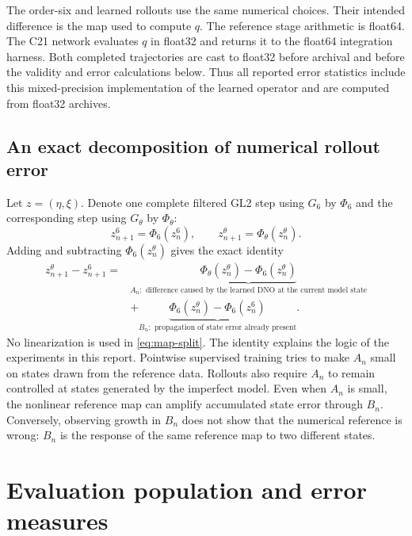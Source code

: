 \documentclass[11pt]{article}
\begin{document}
The order-six and learned rollouts use the same numerical choices.  Their
intended difference is the map used to compute $q$.  The reference stage
arithmetic is float64.  The C21 network evaluates $q$ in float32 and returns it
to the float64 integration harness.  Both completed trajectories are cast to
float32 before archival and before the validity and error calculations below.
Thus all reported error statistics include this mixed-precision implementation
of the learned operator and are computed from float32 archives.

\subsection{An exact decomposition of numerical rollout error}

Let $z=(\eta,\xi)$.  Denote one complete filtered GL2 step using $G_6$ by
$\Phi_6$ and the corresponding step using $G_\theta$ by $\Phi_\theta$:
\begin{equation}
  z_{n+1}^{6}=\Phi_6(z_n^6),
  \qquad
  z_{n+1}^{\theta}=\Phi_\theta(z_n^\theta).
\end{equation}
Adding and subtracting $\Phi_6(z_n^\theta)$ gives the exact identity
\begin{equation}
\begin{split}
 z_{n+1}^{\theta}-z_{n+1}^{6}
 ={}&\underbrace{\Phi_\theta(z_n^\theta)-\Phi_6(z_n^\theta)}_{A_n:
 \text{ difference caused by the learned DNO at the current model state}}\\
 &+\underbrace{\Phi_6(z_n^\theta)-\Phi_6(z_n^6)}_{B_n:
 \text{ propagation of state error already present}}.
\end{split}
\label{eq:map-split}
\end{equation}
No linearization is used in \eqref{eq:map-split}.  The identity explains the
logic of the experiments in this report.  Pointwise supervised training tries
to make $A_n$ small on states drawn from the reference data.  Rollouts also
require $A_n$ to remain controlled at states generated by the imperfect model.
Even when $A_n$ is small, the nonlinear reference map can amplify accumulated
state error through $B_n$.  Conversely, observing growth in $B_n$ does not
show that the numerical reference is wrong: $B_n$ is the response of the same
reference map to two different states.

\section{Evaluation population and error measures}
\end{document}
